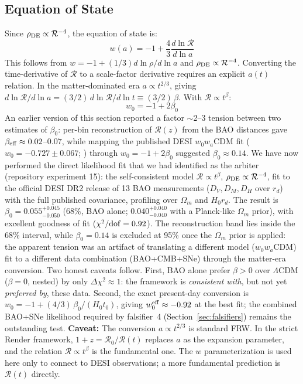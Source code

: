 \documentclass[12pt]{article}
\begin{document}
\subsection{Equation of State}
Since $\rho_{\rm DE} \propto \mathcal{R}^{-4}$, the equation of state is:
\begin{equation}
w(a) = -1 + \frac{4}{3}\frac{d\ln\mathcal{R}}{d\ln a}
\end{equation}
This follows from $w = -1 + (1/3)d\ln\rho/d\ln a$ and $\rho_{\rm DE} \propto \mathcal{R}^{-4}$. Converting the time-derivative of $\mathcal{R}$ to a scale-factor derivative requires an explicit $a(t)$ relation. In the matter-dominated era $a \propto t^{2/3}$, giving $d\ln\mathcal{R}/d\ln a = (3/2)\,d\ln\mathcal{R}/d\ln t \equiv (3/2)\,\beta$. With $\mathcal{R} \propto t^{\beta}$:
\begin{equation}
w_0 = -1 + 2\beta_0
\end{equation}
An earlier version of this section reported a factor $\sim$2--3 tension between two estimates of $\beta_0$: per-bin reconstruction of $\mathcal{R}(z)$ from the BAO distances gave $\beta_{\rm eff} \approx 0.02$--$0.07$, while mapping the published DESI $w_0w_a$CDM fit ($w_0=-0.727\pm0.067$; \citealp{desi2025}) through $w_0=-1+2\beta_0$ suggested $\beta_0\approx0.14$. We have now performed the direct likelihood fit that we had identified as the arbiter (repository experiment 15): the self-consistent model $\mathcal{R}\propto t^{\beta}$, $\rho_{\rm DE}\propto\mathcal{R}^{-4}$, fit to the official DESI DR2 release of 13 BAO measurements ($D_V, D_M, D_H$ over $r_d$) with the full published covariance, profiling over $\Omega_m$ and $H_0 r_d$. The result is $\beta_0 = 0.055^{+0.045}_{-0.050}$ (68\%, BAO alone; $0.040^{+0.040}_{-0.040}$ with a Planck-like $\Omega_m$ prior), with excellent goodness of fit ($\chi^2/{\rm dof}=0.92$). The reconstruction band lies inside the 68\% interval, while $\beta_0=0.14$ is excluded at 95\% once the $\Omega_m$ prior is applied: the apparent tension was an artifact of translating a different model ($w_0w_a$CDM) fit to a different data combination (BAO+CMB+SNe) through the matter-era conversion. Two honest caveats follow. First, BAO alone prefer $\beta>0$ over $\Lambda$CDM ($\beta=0$, nested) by only $\Delta\chi^2 \approx 1$: the framework is \emph{consistent with}, but not yet \emph{preferred by}, these data. Second, the exact present-day conversion is $w_0 = -1 + (4/3)\,\beta_0/(H_0 t_0)$, giving $w_0^{\rm eff} \approx -0.92$ at the best fit; the combined BAO+SNe likelihood required by falsifier~4 (Section~\ref{sec:falsifiers}) remains the outstanding test.
{\bf Caveat:} The conversion $a \propto t^{2/3}$ is standard FRW. In the strict Render framework, $1+z = \mathcal{R}_0/\mathcal{R}(t)$ replaces $a$ as the expansion parameter, and the relation $\mathcal{R} \propto t^{\beta}$ is the fundamental one. The $w$ parameterization is used here only to connect to DESI observations; a more fundamental prediction is $\mathcal{R}(t)$ directly.
\end{document}
